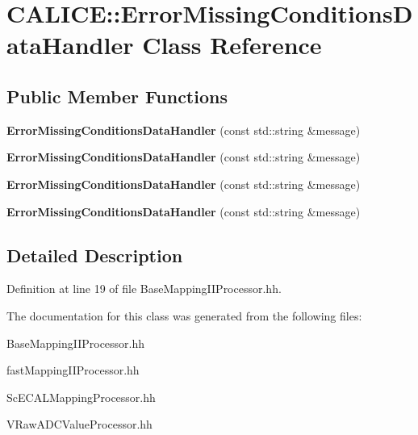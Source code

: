 \section{CALICE::ErrorMissingConditionsDataHandler Class Reference}
\label{classCALICE_1_1ErrorMissingConditionsDataHandler}
\subsection*{Public Member Functions}
\begin{DoxyCompactItemize}
\item 
{\bfseries ErrorMissingConditionsDataHandler} (const std::string \&message)\label{classCALICE_1_1ErrorMissingConditionsDataHandler_a0a85b29547427c53f0c9f5ba5b3070b0}

\item 
{\bfseries ErrorMissingConditionsDataHandler} (const std::string \&message)\label{classCALICE_1_1ErrorMissingConditionsDataHandler_a0a85b29547427c53f0c9f5ba5b3070b0}

\item 
{\bfseries ErrorMissingConditionsDataHandler} (const std::string \&message)\label{classCALICE_1_1ErrorMissingConditionsDataHandler_a0a85b29547427c53f0c9f5ba5b3070b0}

\item 
{\bfseries ErrorMissingConditionsDataHandler} (const std::string \&message)\label{classCALICE_1_1ErrorMissingConditionsDataHandler_a0a85b29547427c53f0c9f5ba5b3070b0}

\end{DoxyCompactItemize}


\subsection{Detailed Description}


Definition at line 19 of file BaseMappingIIProcessor.hh.

The documentation for this class was generated from the following files:\begin{DoxyCompactItemize}
\item 
BaseMappingIIProcessor.hh\item 
fastMappingIIProcessor.hh\item 
ScECALMappingProcessor.hh\item 
VRawADCValueProcessor.hh\end{DoxyCompactItemize}
